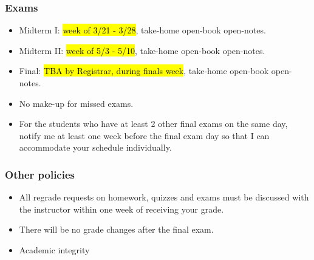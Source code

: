\documentclass[slidestop,compress,mathserif]{beamer}
\begin{document}
\begin{frame}
\frametitle{Exams}
{\footnotesize
\begin{itemize}

\item Midterm I: \hl{week of 3/21 - 3/28}, take-home open-book open-notes.
\item Midterm II: \hl{week of 5/3 - 5/10}, take-home open-book open-notes.\\


\item Final: \hl{TBA by Registrar, during finals week}, take-home open-book open-notes.


\pause
\item No make-up for missed exams.
\item {\footnotesize For the students who have at least 2 other final exams on the same day,
notify me at least one week before the final exam day so that I can accommodate your schedule individually.}

%


\end{itemize}

}

\end{frame}



\begin{frame}
\frametitle{Other policies}

\begin{itemize}


\item All regrade requests on homework, quizzes and exams must be discussed with the instructor within one week of receiving your grade.
\item There will be no grade changes after the final exam.

%
%
\item Academic integrity


\end{itemize}

\end{frame}
\end{document}

